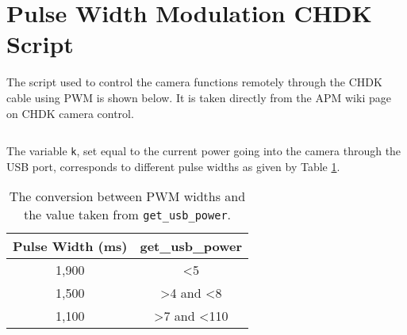 \section{Pulse Width Modulation CHDK Script}
\label{app:pwm}

The script used to control the camera functions remotely through the CHDK cable
using PWM is shown below. It is taken directly from the APM wiki page on CHDK
camera
control.

\inputminted{vb.net}{code/3DR_Shoot.bas}

The variable \texttt{k}, set equal to the current power going into the camera
through the USB port, corresponds to different pulse widths as given by Table
\ref{tab:pwm}.

\begin{table}
    \begin{center}
        \begin{tabular}{| c | c |}
            \hline
            \textbf{Pulse Width (ms)} & \textbf{get\_usb\_power} \\
            \hline
            1,900 & \textless 5 \\
            1,500 & \textgreater 4 and \textless 8 \\
            1,100 & \textgreater 7 and \textless 110 \\
            \hline
        \end{tabular}
        \caption{The conversion between PWM widths and the value taken from
        \texttt{get\_usb\_power}.}
        \label{tab:pwm}
    \end{center}
\end{table}
